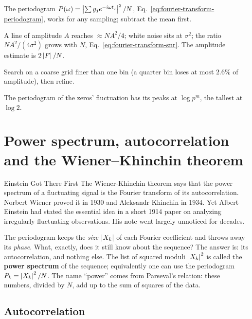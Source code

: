 \begin{keyideas}

\item The periodogram $P(\omega)=\left\lvert \sum y_je^{-i\omega t_j}\right\rvert^2/N$, Eq.~\eqref{eq:fourier-transform-periodogram}, works for any sampling; subtract the mean first.
\item A line of amplitude $A$ reaches $\approx NA^2/4$; white noise sits at $\sigma^2$; the ratio $NA^2/(4\sigma^2)$ grows with $N$, Eq.~\eqref{eq:fourier-transform-snr}. The amplitude estimate is $2\left\lvert F\right\rvert/N$.
\item Search on a coarse grid finer than one bin (a quarter bin loses at most $2.6\%$ of amplitude), then refine.
\item The periodogram of the zeros' fluctuation has its peaks at $\log p^m$, the tallest at $\log 2$.

\end{keyideas}

\section{Power spectrum, autocorrelation and the Wiener--Khinchin theorem}\label{sec:fourier-transform-wk}
\begin{didyouknow}{Einstein Got There First}
The Wiener-Khinchin theorem says that the power spectrum of a fluctuating signal is the Fourier transform of its autocorrelation. Norbert Wiener proved it in 1930 and Aleksandr Khinchin in 1934. Yet Albert Einstein had stated the essential idea in a short 1914 paper on analyzing irregularly fluctuating observations. His note went largely unnoticed for decades.
\end{didyouknow}

The periodogram keeps the \emph{size} $\left\lvert X_k\right\rvert$ of each Fourier coefficient and throws away its \emph{phase}. What, exactly, does it still know about the sequence? The answer is: its autocorrelation, and nothing else. The list of squared moduli $\left\lvert X_k\right\rvert^2$ is called the \textbf{power spectrum} of the sequence; equivalently one can use the periodogram $P_k=\left\lvert X_k\right\rvert^2/N$. The name ``power'' comes from Parseval's relation: these numbers, divided by $N$, add up to the sum of squares of the data.

\subsection{Autocorrelation}

